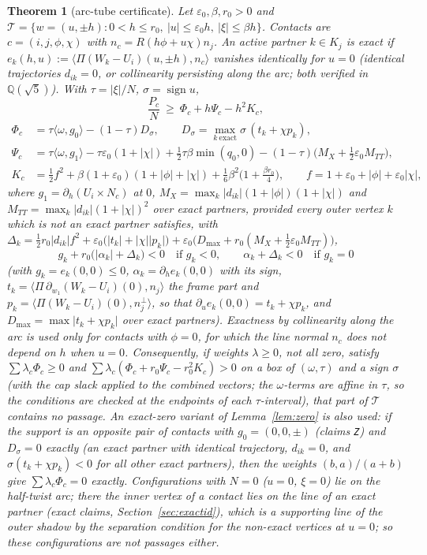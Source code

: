 \documentclass[11pt]{amsart}
\newtheorem{theorem}{Theorem}[section]
\theoremstyle{definition}
\newcommand{\Q}{\mathbb{Q}}
\newcommand{\sq}{\sqrt5}
\newcommand{\Prj}{\Pi}
\newcommand{\ip}[2]{\langle #1,#2\rangle}
\newcommand{\abs}[1]{\lvert #1\rvert}
\begin{document}
\begin{theorem}[arc-tube certificate]\label{thm:tube}
Let $\varepsilon_0,\beta,r_0>0$ and $\mathcal T=\{w=(u,\pm h):0<h\le r_0,\ \abs u\le\varepsilon_0h,\ \abs\xi\le\beta h\}$.
Contacts are $c=(i,j,\phi,\chi)$ with $n_c=R(h\phi+u\chi)n_j$. An active partner $k\in K_j$ is \emph{exact} if
$e_k(h,u):=\ip{\Prj(W_k-U_i)(u,\pm h)}{n_c}$ vanishes identically for $u=0$ (identical trajectories $d_{ik}=0$, or
collinearity persisting along the arc; both verified in $\Q(\sq)$). With $\tau=\abs\xi/N$, $\sigma=\operatorname{sign}u$,
\[
\frac{P_c}{N}\ \ge\ \Phi_c+h\Psi_c-h^2K_c,
\]
\begin{align*}
\Phi_c&=\tau\ip\omega{g_0}-(1-\tau)D_{\sigma},\qquad D_\sigma=\max_{k\ \text{exact}}\sigma\,(t_k+\chi p_k),\\
\Psi_c&=\tau\ip\omega{g_1}-\tau\varepsilon_0(1+\abs\chi)+\tfrac12\tau\beta\min(q_0,0)-(1-\tau)\bigl(M_X+\tfrac12\varepsilon_0M_{TT}\bigr),\\
K_c&=\tfrac12f^2+\beta(1+\varepsilon_0)(1+\abs\phi+\abs\chi)+\tfrac16\beta^2\bigl(1+\tfrac{\beta r_0}4\bigr),
\qquad f=1+\varepsilon_0+\abs\phi+\varepsilon_0\abs\chi,
\end{align*}
where $g_1=\partial_h(U_i\times N_c)$ at $0$, $M_X=\max_k\abs{d_{ik}}(1+\abs\phi)(1+\abs\chi)$ and
$M_{TT}=\max_k\abs{d_{ik}}(1+\abs\chi)^2$ over exact partners, provided every outer vertex $k$ which is not an exact
partner satisfies, with $\Delta_k=\tfrac12r_0\abs{d_{ik}}f^2+\varepsilon_0\bigl(\abs{t_k}+\abs\chi\abs{p_k}\bigr)
+\varepsilon_0\bigl(D_{\max}+r_0(M_X+\tfrac12\varepsilon_0M_{TT})\bigr)$,
\[
g_k+r_0\bigl(\abs{\alpha_k}+\Delta_k\bigr)<0\quad\text{if }g_k<0,\qquad \alpha_k+\Delta_k<0\quad\text{if }g_k=0
\]
(with $g_k=e_k(0,0)\le0$, $\alpha_k=\partial_he_k(0,0)$ with its sign, $t_k=\ip{\Prj\,\partial_{w_1}(W_k-U_i)(0)}{n_j}$
the frame part and $p_k=\ip{\Prj(W_k-U_i)(0)}{n_j^\perp}$, so that $\partial_ue_k(0,0)=t_k+\chi p_k$, and
$D_{\max}=\max\abs{t_k+\chi p_k}$ over exact partners). Exactness by collinearity along the arc is used only for
contacts with $\phi=0$, for which the line normal $n_c$ does not depend on $h$ when $u=0$. Consequently, if weights
$\lambda\ge0$, not all zero, satisfy $\sum\lambda_c\Phi_c\ge0$ and $\sum\lambda_c(\Phi_c+r_0\Psi_c-r_0^2K_c)>0$ on a box of $(\omega,\tau)$ and a
sign $\sigma$ (with the cap slack applied to the combined vectors; the $\omega$-terms are affine in $\tau$, so the
conditions are checked at the endpoints of each $\tau$-interval), that part of $\mathcal T$ contains no passage.
An exact-zero variant of Lemma~\ref{lem:zero} is also used: if the support is an opposite pair of contacts with
$g_0=(0,0,\pm)$ (claims \texttt{Z}) and $D_\sigma=0$ exactly (an exact partner with identical trajectory, $d_{ik}=0$, and
$\sigma(t_k+\chi p_k)<0$ for all other exact partners), then the weights $(b,a)/(a+b)$ give
$\sum\lambda_c\Phi_c=0$ exactly. Configurations with $N=0$ ($u=0$, $\xi=0$) lie on the half-twist arc; there the inner vertex of a contact lies on the
line of an exact partner (exact claims, Section~\ref{sec:exactid}), which is a supporting line of the outer shadow by the
separation condition for the non-exact vertices at $u=0$; so these configurations are not passages either.
\end{theorem}
\end{document}
